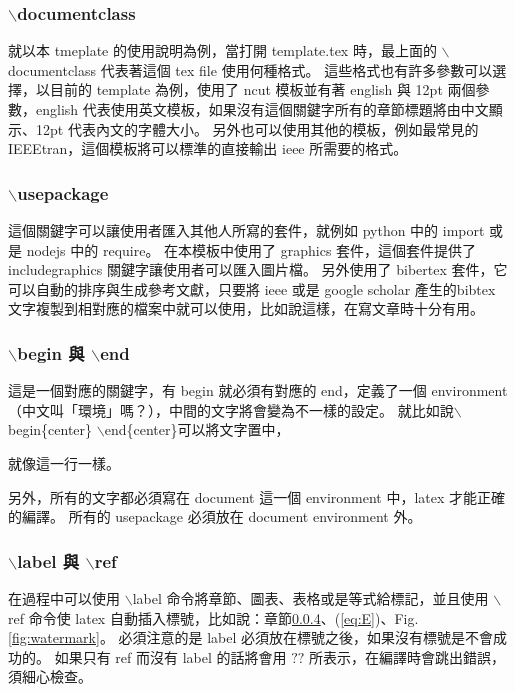\subsubsection{$\backslash$documentclass}

就以本 tmeplate 的使用說明為例，當打開 template.tex 時，最上面的 $\backslash{}$documentclass 代表著這個 tex file 使用何種格式。
這些格式也有許多參數可以選擇，以目前的 template 為例，使用了 ncut 模板並有著 english 與 12pt 兩個參數，english 代表使用英文模板，如果沒有這個關鍵字所有的章節標題將由中文顯示、12pt 代表內文的字體大小。
另外也可以使用其他的模板，例如最常見的 IEEEtran，這個模板將可以標準的直接輸出 ieee 所需要的格式。

\subsubsection{$\backslash$usepackage}

這個關鍵字可以讓使用者匯入其他人所寫的套件，就例如 python 中的 import 或是 nodejs 中的 require。
在本模板中使用了 graphics 套件，這個套件提供了 includegraphics 關鍵字讓使用者可以匯入圖片檔。
另外使用了 bibertex 套件，它可以自動的排序與生成參考文獻，只要將 ieee 或是 google scholar 產生的bibtex 文字複製到相對應的檔案中就可以使用，比如說這樣\cite{9394011}，在寫文章時十分有用。

\subsubsection{$\backslash$begin 與 $\backslash$end}

這是一個對應的關鍵字，有 begin 就必須有對應的 end，定義了一個 environment （中文叫「環境」嗎？），中間的文字將會變為不一樣的設定。
就比如說$\backslash$begin\{center\} $\backslash$end\{center\}可以將文字置中，
\begin{center}
	就像這一行一樣。
\end{center}

另外，所有的文字都必須寫在 document 這一個 environment 中，latex 才能正確的編譯。
所有的 usepackage 必須放在 document environment 外。

\subsubsection{$\backslash$label 與 $\backslash$ref} \label{subsubsec:ref}

在過程中可以使用 $\backslash$label 命令將章節、圖表、表格或是等式給標記，並且使用 $\backslash$ref 命令使 latex 自動插入標號，比如說：章節\ref{subsubsec:ref}、(\ref{eq:E})、Fig. \ref{fig:watermark}。
必須注意的是 label 必須放在標號之後，如果沒有標號是不會成功的。
如果只有 ref 而沒有 label 的話將會用 $??$ 所表示，在編譯時會跳出錯誤，須細心檢查。

